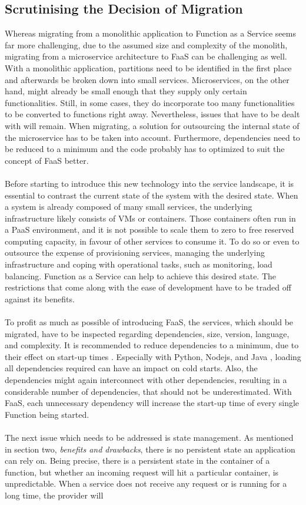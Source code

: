 \documentclass[11pt]{article}
\begin{document}
\subsection{Scrutinising the Decision of Migration}
Whereas migrating from a monolithic application to Function as a Service seems far more challenging, due to the assumed size and complexity of the monolith, migrating from a microservice architecture to FaaS can be challenging as well. With a monolithic application, partitions need to be identified in the first place and afterwards be broken down into small services. Microservices, on the other hand, might already be small enough that they supply only certain functionalities. Still, in some cases, they do incorporate too many functionalities to be converted to functions right away. Nevertheless, issues that have to be dealt with will remain. When migrating, a solution for outsourcing the internal state of the microservice has to be taken into account. Furthermore, dependencies need to be reduced to a minimum and the code probably has to optimized to suit the concept of FaaS better.\\\\ Before starting to introduce this new technology into the service landscape, it is essential to contrast the current state of the system with the desired state. When a system is already composed of many small services, the underlying infrastructure likely consists of VMs or containers. Those containers often run in a PaaS environment, and it is not possible to scale them to zero to free reserved computing capacity, in favour of other services to consume it. To do so or even to outsource the expense of provisioning services, managing the underlying infrastructure and coping with operational tasks, such as monitoring, load balancing. Function as a Service can help to achieve this desired state. The restrictions that come along with the ease of development have to be traded off against its benefits.\\\\ To profit as much as possible of introducing FaaS, the services, which should be migrated, have to be inspected regarding dependencies, size, version, language, and complexity. It is recommended to reduce dependencies to a minimum, due to their effect on start-up times \cite{manner2018cold}. Especially with Python, Nodejs, and Java \cite{puripunpinyo2017effect}, loading all dependencies required can have an impact on cold starts. Also, the dependencies might again interconnect with other dependencies, resulting in a considerable number of dependencies, that should not be underestimated. With FaaS, each unnecessary dependency will increase the start-up time of every single Function being started.\\\\ The next issue which needs to be addressed is state management. As mentioned in section two, \textit{benefits and drawbacks}, there is no persistent state an application can rely on. Being precise, there is a persistent state in the container of a function, but whether an incoming request will hit a particular container, is unpredictable. When a service does not receive any request or is running for a long time, the provider will 
\end{document}
